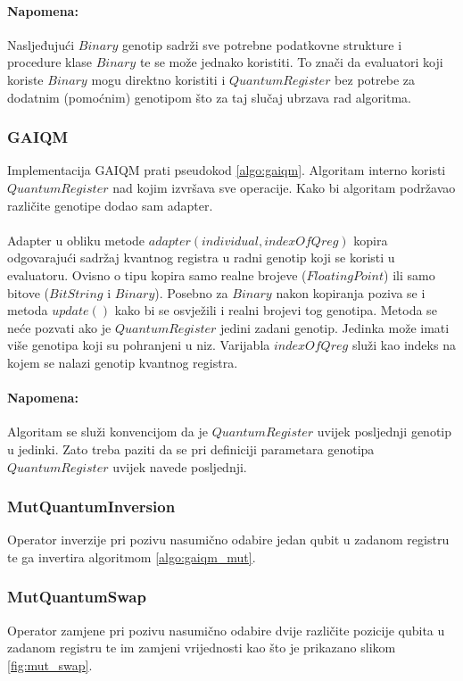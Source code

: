 \documentclass[times, utf8, zavrsni, numeric]{fer}
\begin{document}
\paragraph{Napomena:}
Nasljeđujući $Binary$ genotip sadrži sve potrebne podatkovne strukture i procedure klase $Binary$ te se može jednako koristiti. To znači da evaluatori koji koriste $Binary$ mogu direktno koristiti i $QuantumRegister$ bez potrebe za dodatnim (pomoćnim) genotipom što za taj slučaj ubrzava rad algoritma.

\subsubsection{GAIQM}
Implementacija GAIQM prati pseudokod \ref{algo:gaiqm}. Algoritam interno koristi $QuantumRegister$ nad kojim izvršava sve operacije. Kako bi algoritam podržavao različite genotipe dodao sam adapter.

\paragraph{}
Adapter u obliku metode $adapter(individual, indexOfQreg)$ kopira odgovarajući sadržaj kvantnog registra u radni genotip koji se koristi u evaluatoru. Ovisno o tipu kopira samo realne brojeve ($FloatingPoint$) ili samo bitove ($BitString$ i $Binary$). Posebno za $Binary$ nakon kopiranja poziva se i metoda $update()$ kako bi se osvježili i realni brojevi tog genotipa. Metoda se neće pozvati ako je $QuantumRegister$ jedini zadani genotip. Jedinka može imati više genotipa koji su pohranjeni u niz. Varijabla $indexOfQreg$ služi kao indeks na kojem se nalazi genotip kvantnog registra. 

\paragraph{Napomena:}
Algoritam se služi konvencijom da je $QuantumRegister$ uvijek posljednji genotip u jedinki. Zato treba paziti da se pri definiciji parametara genotipa $QuantumRegister$ uvijek navede posljednji.

\subsubsection{MutQuantumInversion}
Operator inverzije pri pozivu nasumično odabire jedan qubit u zadanom registru te ga invertira algoritmom \ref{algo:gaiqm_mut}.

\subsubsection{MutQuantumSwap}
Operator zamjene pri pozivu nasumično odabire dvije različite pozicije qubita u zadanom registru te im zamjeni vrijednosti kao što je prikazano slikom \ref{fig:mut_swap}.
\end{document}
